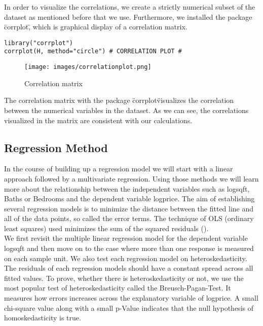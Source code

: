 In order to visualize the correlations, we create a strictly numerical subset of the dataset as mentioned before that we use. Furthermore, we installed the package \"corrplot\", which is graphical display of a correlation matrix. \\

\begin{lstlisting}[frame = single,backgroundcolor=\color{hellgelb}]
library("corrplot")
corrplot(H, method="circle") # CORRELATION PLOT #
\end{lstlisting}


\begin{wrapfigure}{l}{0.5\textwidth}
  \begin{center}
	\texttt{[image: images/correlationplot.png]}
  \end{center}
  \caption{Correlation matrix}
\end{wrapfigure}


The correlation matrix with the package \"corrplot\" visualizes the correlation between the numerical variables in the dataset. As we can see, the correlations visualized in the matrix are consistent with our calculations. \\


\subsection{Regression Method}

In the course of building up a regression model we will start with a linear approach followed by a multivariate regression. Using those methods we will learn more about the relationship between the independent variables such as logsqft, Baths or Bedrooms and the dependent variable logprice. The aim of establishing several regression models is to minimize the distance between the fitted line and all of the data points, so called the error terms. The technique of OLS (ordinary least squares) used minimizes the sum of the squared residuals (\cite{regression}). \\ %

We first revisit the multiple linear regression model for the dependent variable logsqft and then move on to the case where more than one response is measured on each sample unit. We also test each regression model on heteroskedasticity. The residuals of each regression models should have a constant spread across all fitted values. To prove, whether there is heteroskedasticity or not, we use the most popular test of heteroskedasticity called the Breusch-Pagan-Test. It measures how errors increases across the explanatory variable of logprice. A small chi-square value along with a small p-Value indicates that the null hypothesis of homoskedasticity is true. \\


